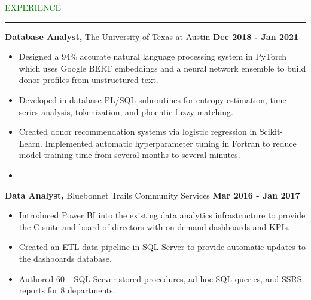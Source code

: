 \documentclass [
        11pt
] {article}
\begin{document}

\noindent\textcolor{green}{EXPERIENCE \rule{15.8cm}{1pt}}

\vspace*{10pt}

\noindent \textbf {Database Analyst,} The University of Texas at Austin
\hspace*{\fill} \textbf {Dec 2018 - Jan 2021}


\begin{itemize}[itemsep=1pt,topsep=1pt]
\renewcommand{\labelitemi}{\scriptsize$\blacksquare$}

\item Designed a 94\% accurate natural language processing system in PyTorch
which uses Google BERT embeddings and a neural network ensemble to build donor
profiles from unstructured text.

\item Developed in-database PL/SQL subroutines for entropy estimation,
time series analysis, tokenization, and phoentic fuzzy matching.

\item Created donor recommendation systems via logistic regression in Scikit-Learn.
Implemented automatic hyperparameter tuning in Fortran to reduce model training 
time from several months to several minutes.

\item  

\end{itemize}

\vspace*{5pt}

\noindent \textbf {Data Analyst,} Bluebonnet Trails Community Services
\hspace*{\fill} \textbf {Mar 2016 - Jan 2017}


\begin{itemize}[itemsep=1pt,topsep=1pt]
\renewcommand{\labelitemi}{\scriptsize$\blacksquare$}

\item Introduced Power BI into the existing data analytics infrastructure to
provide the C-suite and board of directors with  on-demand dashboards and KPIs.

\item Created an ETL data pipeline in SQL Server to provide automatic
updates to the dashboards database.

\item Authored 60+ SQL Server stored procedures, ad-hoc SQL queries, and SSRS
reports for 8 departments.

\end{itemize}
\end{document}
